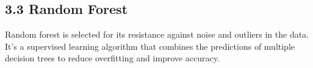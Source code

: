 \documentclass[12pt, letterpaper]{report}
\begin{document}
\vspace{-0.55cm}
\subsection*{3.3 Random Forest}

Random forest is selected for its resistance against noise and outliers in the data. It's a supervised learning algorithm that combines the predictions of multiple decision trees to reduce overfitting and improve accuracy. 
\begin{table}[h]
\centering
{}
\caption{Random Forest Performance}
\end{table}



\end{document}
